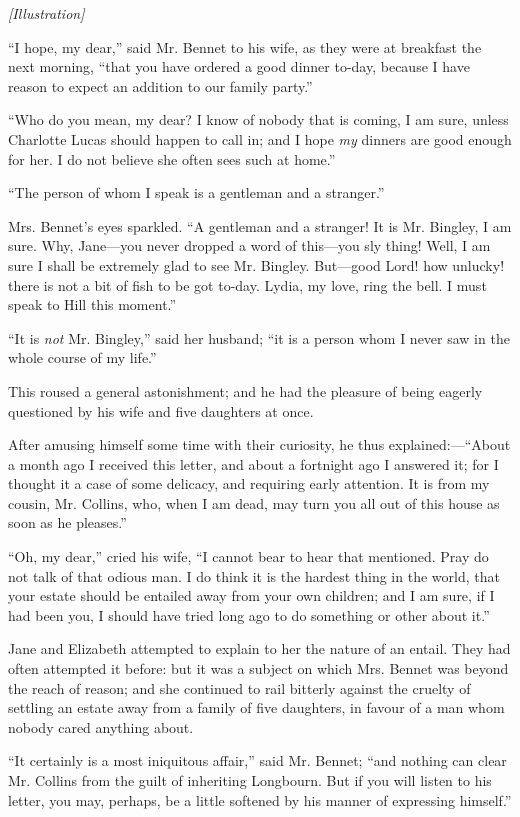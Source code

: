 \documentclass[12pt]{book}
\begin{document}
\emph{[Illustration]}

``I hope, my dear,'' said Mr. Bennet to his wife, as they were at breakfast the next morning, ``that you have ordered a good dinner to-day, because I have reason to expect an addition to our family party.''

``Who do you mean, my dear? I know of nobody that is coming, I am sure, unless Charlotte Lucas should happen to call in; and I hope \textit{my} dinners are good enough for her. I do not believe she often sees such at home.''

``The person of whom I speak is a gentleman and a stranger.''

Mrs. Bennet's eyes sparkled. ``A gentleman and a stranger! It is Mr. Bingley, I am sure. Why, Jane---you never dropped a word of this---you sly thing! Well, I am sure I shall be extremely glad to see Mr. Bingley. But---good Lord! how unlucky! there is not a bit of fish to be got to-day. Lydia, my love, ring the bell. I must speak to Hill this moment.''

``It is \textit{not} Mr. Bingley,'' said her husband; ``it is a person whom I never saw in the whole course of my life.''

This roused a general astonishment; and he had the pleasure of being eagerly questioned by his wife and five daughters at once.

After amusing himself some time with their curiosity, he thus explained:---``About a month ago I received this letter, and about a fortnight ago I answered it; for I thought it a case of some delicacy, and requiring early attention. It is from my cousin, Mr. Collins, who, when I am dead, may turn you all out of this house as soon as he pleases.''

``Oh, my dear,'' cried his wife, ``I cannot bear to hear that mentioned. Pray do not talk of that odious man. I do think it is the hardest thing in the world, that your estate should be entailed away from your own children; and I am sure, if I had been you, I should have tried long ago to do something or other about it.''

Jane and Elizabeth attempted to explain to her the nature of an entail. They had often attempted it before: but it was a subject on which Mrs. Bennet was beyond the reach of reason; and she continued to rail bitterly against the cruelty of settling an estate away from a family of five daughters, in favour of a man whom nobody cared anything about.

``It certainly is a most iniquitous affair,'' said Mr. Bennet; ``and nothing can clear Mr. Collins from the guilt of inheriting Longbourn. But if you will listen to his letter, you may, perhaps, be a little softened by his manner of expressing himself.''
\end{document}

